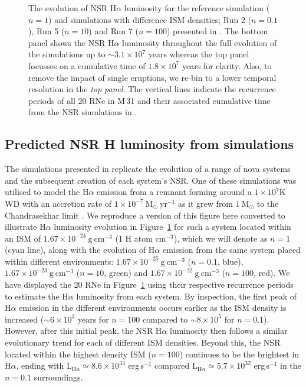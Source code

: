 \documentclass[fleqn,usenatbib]{mnras}
\begin{document}
\begin{figure}
\caption{The evolution of NSR H$\alpha$ luminosity for the reference simulation ($n=1$) and simulations with difference ISM densities; Run 2 ($n=0.1$), Run 5 ($n=10$) and Run 7 ($n=100$) presented in \citet{2023MNRAS.521.3004H}. The bottom panel shows the NSR H$\alpha$ luminosity throughout the full evolution of the simulations up to ${\sim}3.1 \times 10^7$ years whereas the top panel focusses on a cumulative time of $ 1.8 \times 10^7$ years for clarity. Also, to remove the impact of single eruptions, we re-bin to a lower temporal resolution in the {\it top panel}. The vertical lines indicate the recurrence periods of all 20 RNe in M\,31 and their associated cumulative time from the NSR simulations in \citet{2023MNRAS.521.3004H}.}
\label{fig:Halpha Evolution}
\end{figure}
\subsection{Predicted NSR H\texorpdfstring{\boldmath{$\alpha$}}{alpha} luminosity from simulations}\label{sec:Predicted Ha luminosity}
The simulations presented in \citet{2023MNRAS.521.3004H} replicate the evolution of a range of nova systems and the subsequent creation of each system's NSR. One of these simulations was utilised to model the H$\alpha$ emission from a remnant forming around a $1 \times 10^7$K WD with an accretion rate of $1 \times 10^{-7} \ \text{M}_{\odot} \ \text{yr}^{-1}$ as it grew from $1 \ \text{M}_{\odot}$ to the Chandrasekhar limit \citep[see][their Figure 14]{2023MNRAS.521.3004H}. We reproduce a version of this figure here converted to illustrate H$\alpha$ luminosity evolution in Figure~\ref{fig:Halpha Evolution} for such a system located within an ISM of $1.67 \times 10^{-24} \ \text{g} \ \text{cm}^{-3}$ (1 H atom $\text{cm}^{-3}$), which we will denote as $n=1$ (cyan line), along with the evolution of H$\alpha$ emission from the same system placed within different environments: $1.67 \times 10^{-25} \ \text{g} \ \text{cm}^{-3}$ ($n=0.1$, blue), $1.67 \times 10^{-23} \ \text{g} \ \text{cm}^{-3}$ ($n=10$, green) and $1.67 \times 10^{-22} \ \text{g} \ \text{cm}^{-3}$ ($n=100$, red). We have displayed the 20 RNe in Figure~\ref{fig:Halpha Evolution} using their respective recurrence periods to estimate the H$\alpha$ luminosity from each system. By inspection, the first peak of H$\alpha$ emission in the different environments occurs earlier as the ISM density is increased (${\sim}6 \times 10^3$ years for $n=100$ compared to ${\sim}8 \times 10^5$ for $n=0.1$). However, after this initial peak, the NSR H$\alpha$ luminosity then follows a similar evolutionary trend for each of different ISM densities. Beyond this, the NSR located within the highest density ISM ($n=100$) continues to be the brightest in H$\alpha$, ending with $\text{L}_{\text{H}\alpha}\simeq8.6 \times 10^{33}$ erg\,s$^{-1}$ compared $\text{L}_{\text{H}\alpha}\simeq5.7 \times 10^{32}$ erg\,s$^{-1}$ in the $n=0.1$ surroundings.
\end{document}
